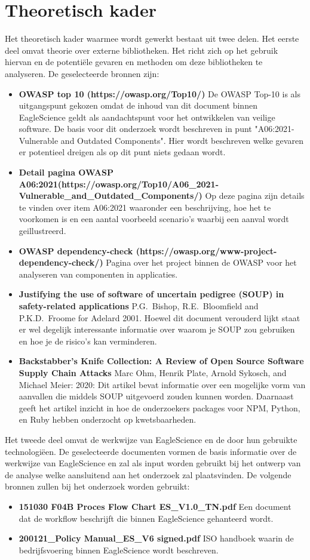 \section{Theoretisch kader}\label{sec:theoretisch-kader}
Het theoretisch kader waarmee wordt gewerkt bestaat uit twee delen. Het eerste deel omvat theorie over externe bibliotheken. Het richt zich op het gebruik hiervan en de potentiële gevaren en methoden om deze bibliotheken te analyseren. De geselecteerde bronnen zijn:
\begin{itemize}
    \item \textbf{OWASP top 10 (https://owasp.org/Top10/)} De OWASP Top-10 is als uitgangspunt gekozen omdat de inhoud van dit document binnen EagleScience geldt als aandachtspunt voor het ontwikkelen van veilige software. De basis voor dit onderzoek wordt beschreven in punt "A06:2021-Vulnerable and Outdated Components". Hier wordt beschreven welke gevaren er potentieel dreigen als op dit punt niets gedaan wordt.
    \item \textbf{Detail pagina OWASP A06:2021(https://owasp.org/Top10/A06\_2021-Vulnerable\_and\_Outdated\_Components/)} Op deze pagina zijn details te vinden over item A06:2021 waaronder een beschrijving, hoe het te voorkomen is en een aantal voorbeeld scenario's waarbij een aanval wordt geillustreerd.
    \item \textbf{OWASP dependency-check (https://owasp.org/www-project-dependency-check/)} Pagina over het project binnen de OWASP voor het analyseren van componenten in applicaties.
    \item \textbf{Justifying the use of software of uncertain pedigree (SOUP) in safety-related applications} P.G.\ Bishop, R.E.\ Bloomfield and P.K.D.\  Froome for Adelard 2001. Hoewel dit document verouderd lijkt staat er wel degelijk interessante informatie over waarom je SOUP zou gebruiken en hoe je de risico's kan verminderen.
    \item \textbf{Backstabber’s Knife Collection: A Review of Open Source Software Supply Chain Attacks} Marc Ohm, Henrik Plate, Arnold Sykosch, and Michael Meier: 2020: Dit artikel bevat informatie over een mogelijke vorm van aanvallen die middels SOUP uitgevoerd zouden kunnen worden. Daarnaast geeft het artikel inzicht in hoe de onderzoekers packages voor NPM, Python, en Ruby hebben onderzocht op kwetsbaarheden.
\end{itemize}
Het tweede deel omvat de werkwijze van EagleScience en de door hun gebruikte technologiëen. De geselecteerde documenten vormen de basis informatie over de werkwijze van EagleScience en zal als input worden gebruikt bij het ontwerp van de analyse welke aansluitend aan het onderzoek zal plaatsvinden. De volgende bronnen zullen bij het onderzoek worden gebruikt:
\begin{itemize}
    \item \textbf{151030 F04B Proces Flow Chart ES\_V1.0\_TN.pdf} Een document dat de workflow beschrijft die binnen EagleScience gehanteerd wordt.
    \item \textbf{200121\_Policy Manual\_ES\_V6 signed.pdf} ISO handboek waarin de bedrijfsvoering binnen EagleScience wordt beschreven.
\end{itemize}

